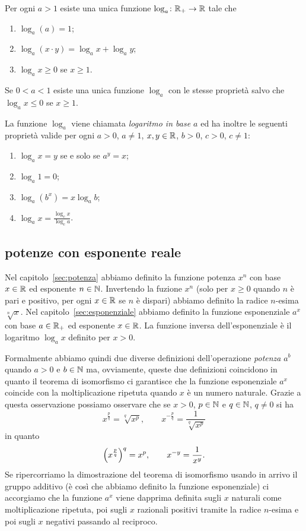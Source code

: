 \begin{theorem}
Per ogni $a>1$
esiste una unica funzione $\log_a\colon {\mathbb R}_+\to {\mathbb R}$ 
tale che 
\begin{enumerate}
  \item $\log_a(a) = 1$;
  \item $\log_a(x\cdot y) =\log_a x + \log_a y$;
  \item $\log_a x \ge 0$ se $x\ge 1$. 
\end{enumerate}
Se $0<a<1$ 
esiste una unica funzione $\log_a$ con le stesse proprietà 
salvo che $\log_a x \le 0$ se $x\ge 1$.

La funzione $\log_a$ viene chiamata \emph{logaritmo in base $a$}
ed ha inoltre le seguenti proprietà valide 
per ogni $a>0$, $a\neq 1$, $x,y\in {\mathbb R}$, $b>0$, $c>0$, $c\neq 1$:
\begin{enumerate}
  \item $\log_a x = y$ se e solo se $a^y = x$;
  \item $\log_a 1 = 0$;
  \item $\log_a (b^x) = x\log_a b$;
  \item $\log_a x = \frac{\log_c x}{\log_c a}$.
\end{enumerate}
\end{theorem}

\subsection{potenze con esponente reale}

Nel capitolo~\ref{sec:potenza} abbiamo definito 
la funzione potenza $x^n$ con base $x\in {\mathbb R}$ 
ed esponente $n\in {\mathbb N}$. 
Invertendo la fuzione $x^n$ 
(solo per $x\ge 0$ quando $n$ è pari e positivo, per ogni $x\in {\mathbb R}$ se 
$n$ è dispari) abbiamo definito la radice $n$-esima 
$\sqrt[n]{x}$.
Nel capitolo~\ref{sec:esponenziale} abbiamo 
definito la funzione esponenziale $a^x$ con 
base $a\in {\mathbb R}_+$ ed esponente $x\in {\mathbb R}$.
La funzione inversa dell'esponenziale 
è il logaritmo $\log_a x$ definito per $x>0$.

Formalmente abbiamo quindi due diverse definizioni 
dell'operazione \emph{potenza} $a^b$ quando $a>0$ 
e $b\in {\mathbb N}$ ma, ovviamente, queste due definizioni 
coincidono in quanto il teorema di isomorfismo 
ci garantisce che la funzione esponenziale 
$a^x$ coincide con la moltiplicazione ripetuta 
quando $x$ è un numero naturale.
Grazie a questa osservazione possiamo osservare 
che se $x>0$, $p\in {\mathbb N}$ e $q\in {\mathbb N}$, $q\neq 0$ si ha 
\begin{equation}
\label{eq:9783023}
  x^{\frac p q} = \sqrt[q]{x^p}, 
  \qquad 
  x^{-\frac p q} = \frac{1}{\sqrt[q]{x^p}}
\end{equation}
in quanto 
\[
  {\left( x^{\frac p q} \right)}^q = x^p,
  \qquad
  x^{-y} = \frac{1}{x^y}.
\]
Se ripercorriamo la dimostrazione del teorema di isomorfismo 
usando in arrivo il gruppo additivo (è così che abbiamo 
definito la funzione esponenziale) ci accorgiamo 
che la funzione $a^x$ viene dapprima definita sugli $x$
naturali come moltiplicazione ripetuta, 
poi sugli $x$ razionali 
positivi tramite la radice $n$-esima e poi sugli 
$x$ negativi passando al reciproco.

